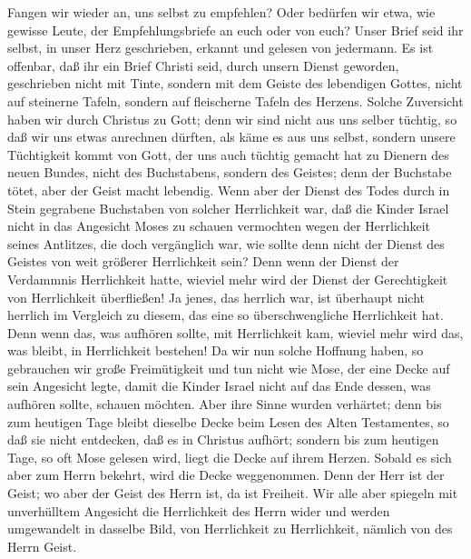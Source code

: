  Fangen wir wieder an, uns selbst zu empfehlen? Oder
bedürfen wir etwa, wie gewisse Leute, der Empfehlungsbriefe an euch oder
von euch?  Unser Brief seid ihr selbst, in unser Herz
geschrieben, erkannt und gelesen von jedermann.  Es ist
offenbar, daß ihr ein Brief Christi seid, durch unsern Dienst geworden,
geschrieben nicht mit Tinte, sondern mit dem Geiste des lebendigen
Gottes, nicht auf steinerne Tafeln, sondern auf fleischerne Tafeln des
Herzens.  Solche Zuversicht haben wir durch Christus zu
Gott;  denn wir sind nicht aus uns selber tüchtig, so daß
wir uns etwas anrechnen dürften, als käme es aus uns selbst, sondern
unsere Tüchtigkeit kommt von Gott,  der uns auch tüchtig
gemacht hat zu Dienern des neuen Bundes, nicht des Buchstabens, sondern
des Geistes; denn der Buchstabe tötet, aber der Geist macht lebendig.
 Wenn aber der Dienst des Todes durch in Stein gegrabene
Buchstaben von solcher Herrlichkeit war, daß die Kinder Israel nicht in
das Angesicht Moses zu schauen vermochten wegen der Herrlichkeit seines
Antlitzes, die doch vergänglich war,  wie sollte denn
nicht der Dienst des Geistes von weit größerer Herrlichkeit sein?
 Denn wenn der Dienst der Verdammnis Herrlichkeit hatte,
wieviel mehr wird der Dienst der Gerechtigkeit von Herrlichkeit
überfließen!  Ja jenes, das herrlich war, ist überhaupt
nicht herrlich im Vergleich zu diesem, das eine so überschwengliche
Herrlichkeit hat.  Denn wenn das, was aufhören sollte,
mit Herrlichkeit kam, wieviel mehr wird das, was bleibt, in Herrlichkeit
bestehen!  Da wir nun solche Hoffnung haben, so
gebrauchen wir große Freimütigkeit  und tun nicht wie
Mose, der eine Decke auf sein Angesicht legte, damit die Kinder Israel
nicht auf das Ende dessen, was aufhören sollte, schauen möchten.
 Aber ihre Sinne wurden verhärtet; denn bis zum heutigen
Tage bleibt dieselbe Decke beim Lesen des Alten Testamentes, so daß sie
nicht entdecken, daß es in Christus aufhört;  sondern bis
zum heutigen Tage, so oft Mose gelesen wird, liegt die Decke auf ihrem
Herzen.  Sobald es sich aber zum Herrn bekehrt, wird die
Decke weggenommen.  Denn der Herr ist der Geist; wo aber
der Geist des Herrn ist, da ist Freiheit.  Wir alle aber
spiegeln mit unverhülltem Angesicht die Herrlichkeit des Herrn wider und
werden umgewandelt in dasselbe Bild, von Herrlichkeit zu Herrlichkeit,
nämlich von des Herrn Geist.


